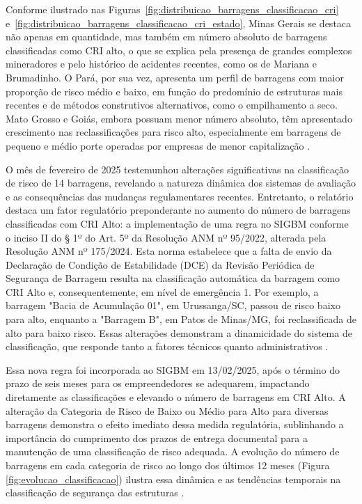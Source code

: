 Conforme ilustrado nas Figuras~\ref{fig:distribuicao_barragens_classificacao_cri} e~\ref{fig:distribuicao_barragens_classificacao_cri_estado}, Minas Gerais se destaca não apenas em quantidade, mas também em número absoluto de barragens classificadas como CRI alto, o que se explica pela presença de grandes complexos mineradores e pelo histórico de acidentes recentes, como os de Mariana e Brumadinho. O Pará, por sua vez, apresenta um perfil de barragens com maior proporção de risco médio e baixo, em função do predomínio de estruturas mais recentes e de métodos construtivos alternativos, como o empilhamento a seco. Mato Grosso e Goiás, embora possuam menor número absoluto, têm apresentado crescimento nas reclassificações para risco alto, especialmente em barragens de pequeno e médio porte operadas por empresas de menor capitalização \cite{anm2025boletim}.

O mês de fevereiro de 2025 testemunhou alterações significativas na classificação de risco de 14 barragens, revelando a natureza dinâmica dos sistemas de avaliação e as consequências das mudanças regulamentares recentes. Entretanto, o relatório destaca um fator regulatório preponderante no aumento do número de barragens classificadas com CRI Alto: a implementação de uma regra no SIGBM conforme o inciso II do § 1º do Art. 5º da Resolução ANM nº 95/2022, alterada pela Resolução ANM nº 175/2024. Esta norma estabelece que a falta de envio da Declaração de Condição de Estabilidade (DCE) da Revisão Periódica de Segurança de Barragem resulta na classificação automática da barragem como CRI Alto e, consequentemente, em nível de emergência 1. Por exemplo, a barragem "Bacia de Acumulação 01", em Urussanga/SC, passou de risco baixo para alto, enquanto a "Barragem B", em Patos de Minas/MG, foi reclassificada de alto para baixo risco. Essas alterações demonstram a dinamicidade do sistema de classificação, que responde tanto a fatores técnicos quanto administrativos \cite{anm2025boletim}.

Essa nova regra foi incorporada ao SIGBM em 13/02/2025, após o término do prazo de seis meses para os empreendedores se adequarem, impactando diretamente as classificações e elevando o número de barragens em CRI Alto. A alteração da Categoria de Risco de Baixo ou Médio para Alto para diversas barragens demonstra o efeito imediato dessa medida regulatória, sublinhando a importância do cumprimento dos prazos de entrega documental para a manutenção de uma classificação de risco adequada. A evolução do número de barragens em cada categoria de risco ao longo dos últimos 12 meses (Figura \ref{fig:evolucao_classificacao}) ilustra essa dinâmica e as tendências temporais na classificação de segurança das estruturas \cite{anm2025boletim}.

